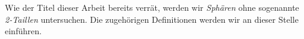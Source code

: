 \documentclass[12pt,titlepage,twoside,cleardoublepage]{article}
\theoremstyle{nummermitklammern}
\newtheorem{lemma}[temp]{Lemma}
\newtheorem{lemma}[zahl]{Lemma}
\numberwithin{equation}{section}
\begin{document}





Wie der Titel dieser Arbeit bereits verrät, werden wir \emph{Sphären} ohne sogenannte \emph{2-Taillen} untersuchen. Die zugehörigen Definitionen werden wir an dieser Stelle einführen.
\end{document}
